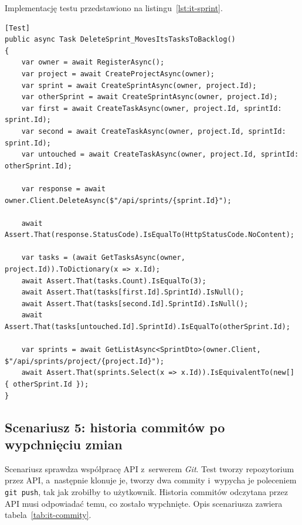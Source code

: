 Implementację testu przedstawiono na listingu~\ref{lst:it-sprint}.

\begin{lstlisting}[basicstyle=\footnotesize\ttfamily, captionpos=t, caption={Test przeniesienia zadań do backlogu po usunięciu sprintu}, label={lst:it-sprint}]
[Test]
public async Task DeleteSprint_MovesItsTasksToBacklog()
{
    var owner = await RegisterAsync();
    var project = await CreateProjectAsync(owner);
    var sprint = await CreateSprintAsync(owner, project.Id);
    var otherSprint = await CreateSprintAsync(owner, project.Id);
    var first = await CreateTaskAsync(owner, project.Id, sprintId: sprint.Id);
    var second = await CreateTaskAsync(owner, project.Id, sprintId: sprint.Id);
    var untouched = await CreateTaskAsync(owner, project.Id, sprintId: otherSprint.Id);

    var response = await owner.Client.DeleteAsync($"/api/sprints/{sprint.Id}");

    await Assert.That(response.StatusCode).IsEqualTo(HttpStatusCode.NoContent);

    var tasks = (await GetTasksAsync(owner, project.Id)).ToDictionary(x => x.Id);
    await Assert.That(tasks.Count).IsEqualTo(3);
    await Assert.That(tasks[first.Id].SprintId).IsNull();
    await Assert.That(tasks[second.Id].SprintId).IsNull();
    await Assert.That(tasks[untouched.Id].SprintId).IsEqualTo(otherSprint.Id);

    var sprints = await GetListAsync<SprintDto>(owner.Client, $"/api/sprints/project/{project.Id}");
    await Assert.That(sprints.Select(x => x.Id)).IsEquivalentTo(new[] { otherSprint.Id });
}
\end{lstlisting}

\subsection{Scenariusz 5: historia commitów po wypchnięciu zmian}
Scenariusz sprawdza współpracę API z~serwerem \textit{Git}. Test tworzy repozytorium przez API, a~następnie klonuje je,
tworzy dwa commity i~wypycha je poleceniem \texttt{git push}, tak jak zrobiłby to użytkownik. Historia commitów
odczytana przez API musi odpowiadać temu, co zostało wypchnięte. Opis scenariusza zawiera tabela~\ref{tab:it-commity}.

